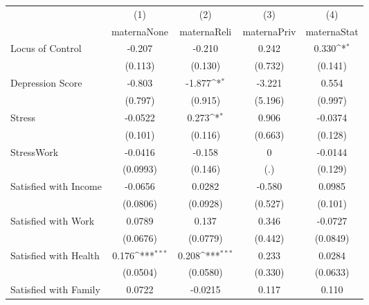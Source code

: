 {
\def\sym#1{\ifmmode^{#1}\else\(^{#1}\)\fi}
\begin{tabular}{l*{4}{c}}
\hline\hline
            &\multicolumn{1}{c}{(1)}&\multicolumn{1}{c}{(2)}&\multicolumn{1}{c}{(3)}&\multicolumn{1}{c}{(4)}\\
            &\multicolumn{1}{c}{maternaNone}&\multicolumn{1}{c}{maternaReli}&\multicolumn{1}{c}{maternaPriv}&\multicolumn{1}{c}{maternaStat}\\
\hline
Locus of Control&      -0.207         &      -0.210         &       0.242         &       0.330\sym{*}  \\
            &     (0.113)         &     (0.130)         &     (0.732)         &     (0.141)         \\
[1em]
Depression Score&      -0.803         &      -1.877\sym{*}  &      -3.221         &       0.554         \\
            &     (0.797)         &     (0.915)         &     (5.196)         &     (0.997)         \\
[1em]
Stress      &     -0.0522         &       0.273\sym{*}  &       0.906         &     -0.0374         \\
            &     (0.101)         &     (0.116)         &     (0.663)         &     (0.128)         \\
[1em]
StressWork  &     -0.0416         &      -0.158         &           0         &     -0.0144         \\
            &    (0.0993)         &     (0.146)         &         (.)         &     (0.129)         \\
[1em]
Satisfied with Income&     -0.0656         &      0.0282         &      -0.580         &      0.0985         \\
            &    (0.0806)         &    (0.0928)         &     (0.527)         &     (0.101)         \\
[1em]
Satisfied with Work&      0.0789         &       0.137         &       0.346         &     -0.0727         \\
            &    (0.0676)         &    (0.0779)         &     (0.442)         &    (0.0849)         \\
[1em]
Satisfied with Health&       0.176\sym{***}&       0.208\sym{***}&       0.233         &      0.0284         \\
            &    (0.0504)         &    (0.0580)         &     (0.330)         &    (0.0633)         \\
[1em]
Satisfied with Family&      0.0722         &     -0.0215         &       0.117         &       0.110         \\

\end{tabular}}
